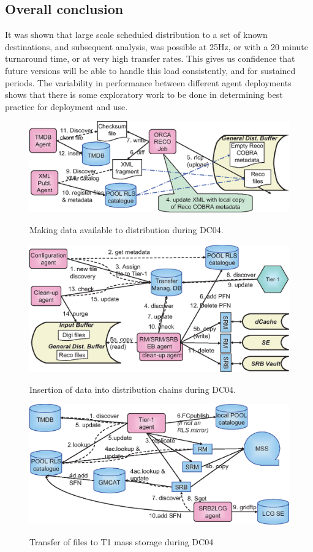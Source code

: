 \documentclass{cmspaper}
\begin{document}
\subsection{Overall conclusion}
It was shown that large scale scheduled distribution to a set of known
destinations, and subsequent analysis, was possible at 25Hz, or with a
20 minute turnaround time, or at very high transfer rates. This gives
us confidence that future versions will be able to handle this load
consistently, and for sustained periods. The variability in
performance between different agent deployments shows that there is
some exploratory work to be done in determining best practice for
deployment and use.




\clearpage
\begin{figure}[tbp]
\centering \includegraphics[angle = 90]{T0-flow.eps}
\label{fig:flow1}
\caption{Making data available to distribution during DC04.}
\end{figure}
\clearpage
\begin{figure}[tbp]
\centering
\includegraphics[angle = 90]{T0-flow-2.eps}
\label{fig:flow2}
\caption{Insertion of data into distribution chains during DC04.}
\end{figure}
\clearpage
\begin{figure}[tbp]
\centering
\includegraphics[angle = 90]{T1-flow.eps}
\label{fig:flow3}
\caption{Transfer of files to T1 mass storage during DC04}
\end{figure}
\end{document}
